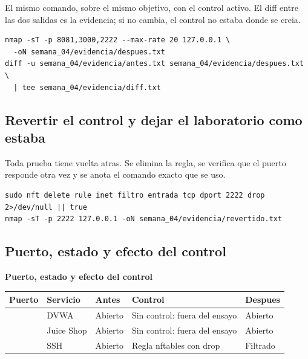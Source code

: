 \documentclass[11pt,a4paper]{article}
\begin{document}
El mismo comando, sobre el mismo objetivo, con el control activo. El diff entre las dos salidas es la evidencia; si no cambia, el control no estaba donde se creia.

\begin{lstlisting}[style=estiloCodigo]
nmap -sT -p 8081,3000,2222 --max-rate 20 127.0.0.1 \
  -oN semana_04/evidencia/despues.txt
diff -u semana_04/evidencia/antes.txt semana_04/evidencia/despues.txt \
  | tee semana_04/evidencia/diff.txt
\end{lstlisting}

\subsection{Revertir el control y dejar el laboratorio como estaba}

Toda prueba tiene vuelta atras. Se elimina la regla, se verifica que el puerto responde otra vez y se anota el comando exacto que se uso.

\begin{lstlisting}[style=estiloCodigo]
sudo nft delete rule inet filtro entrada tcp dport 2222 drop 2>/dev/null || true
nmap -sT -p 2222 127.0.0.1 -oN semana_04/evidencia/revertido.txt
\end{lstlisting}

\subsection{Puerto, estado y efecto del control}

\begin{center}
\begin{minipage}{\linewidth}
\centering
{\footnotesize
\textbf{Puerto, estado y efecto del control}\par\smallskip
\begin{tabular}{@{}>{\raggedright\arraybackslash}p{1.50cm}>{\raggedright\arraybackslash}p{2.40cm}>{\raggedright\arraybackslash}p{2.60cm}>{\raggedright\arraybackslash}p{4.40cm}>{\raggedright\arraybackslash}p{3.00cm}@{}}
\toprule
\textbf{Puerto} & \textbf{Servicio} & \textbf{Antes} & \textbf{Control} & \textbf{Despues} \\
\midrule
8081 & DVWA & Abierto & Sin control: fuera del ensayo & Abierto \\
3000 & Juice Shop & Abierto & Sin control: fuera del ensayo & Abierto \\
2222 & SSH & Abierto & Regla nftables con drop & Filtrado \\
\bottomrule
\end{tabular}
}
\par{}
\end{minipage}
\end{center}
\end{document}
